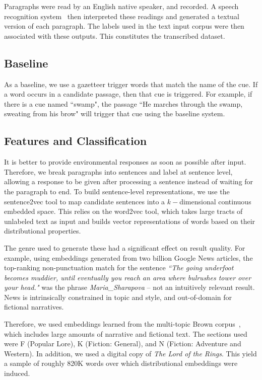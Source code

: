 \documentclass[10pt,a4paper]{article}
\begin{document}
Paragraphs were read by an English native speaker, and recorded.
A speech recognition system~\cite{lamere2003design} then interpreted these readings and generated a textual version of each paragraph.
The labels used in the text input corpus were then associated with these outputs.
This constitutes the transcribed dataset.

\subsection{Baseline}
As a baseline, we use a gazetteer trigger words that match the name of the cue.
If a word occurs in a candidate passage, then that cue is triggered.
For example, if there is a cue named ``swamp", the passage ``He marches through the swamp, sweating from his brow" will trigger that cue using the baseline system.

\subsection{Features and Classification}

It is better to provide environmental responses as soon as possible after input.
Therefore, we break paragraphs into sentences and label at sentence level, allowing a response to be given after processing a sentence instead of waiting for the paragraph to end.
To build sentence-level representations, we use the sentence2vec tool to map candidate sentences into a $k-$dimensional continuous embedded space.
This relies on the word2vec tool, which takes large tracts of unlabeled text as input and builds vector representations of words based on their distributional properties.

The genre used to generate these had a significant effect on result quality.
For example, using embeddings generated from two billion Google News articles, the top-ranking non-punctuation match for the sentence \emph{``The going underfoot becomes muddier, until eventually you reach an area where bulrushes tower over your head."} was the phrase {\em Maria\_Sharapova} -- not an intuitively relevant result.
News is intrinsically constrained in topic and style, and out-of-domain for fictional narratives.

Therefore, we used embeddings learned from the multi-topic Brown corpus~\cite{francis1979brown}, which includes large amounts of narrative and fictional text.
The sections used were F (Popular Lore), K (Fiction: General), and N (Fiction: Adventure and Western).
In addition, we used a digital copy of {\em The Lord of the Rings}.
This yield a sample of roughly 820K words over which distributional embeddings were induced.
\end{document}
